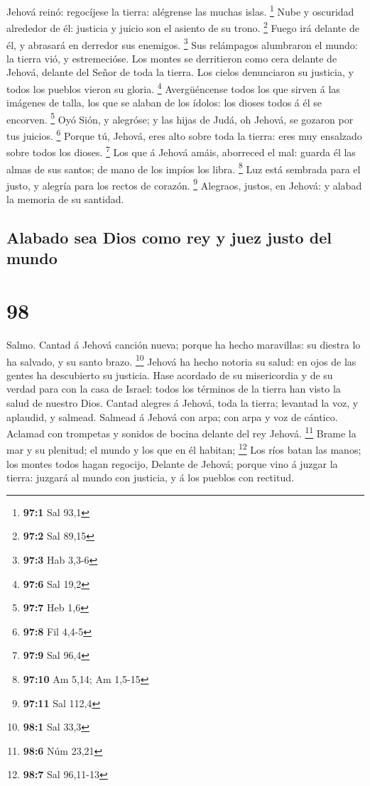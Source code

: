  Jehová reinó: regocíjese la tierra: alégrense las muchas
islas. \footnote{\textbf{97:1} Sal 93,1}  Nube y oscuridad
alrededor de él: justicia y juicio son el asiento de su trono.
\footnote{\textbf{97:2} Sal 89,15}  Fuego irá delante de él,
y abrasará en derredor sus enemigos. \footnote{\textbf{97:3} Hab 3,3-6}
 Sus relámpagos alumbraron el mundo: la tierra vió, y
estremecióse.  Los montes se derritieron como cera delante
de Jehová, delante del Señor de toda la tierra.  Los cielos
denunciaron su justicia, y todos los pueblos vieron su gloria.
\footnote{\textbf{97:6} Sal 19,2}  Avergüéncense todos los
que sirven á las imágenes de talla, los que se alaban de los ídolos: los
dioses todos á él se encorven. \footnote{\textbf{97:7} Heb 1,6}
 Oyó Sión, y alegróse; y las hijas de Judá, oh Jehová, se
gozaron por tus juicios. \footnote{\textbf{97:8} Fil 4,4-5} 
Porque tú, Jehová, eres alto sobre toda la tierra: eres muy ensalzado
sobre todos los dioses. \footnote{\textbf{97:9} Sal 96,4} 
Los que á Jehová amáis, aborreced el mal: guarda él las almas de sus
santos; de mano de los impíos los libra. \footnote{\textbf{97:10} Am
  5,14; Am 1,5-15}  Luz está sembrada para el justo, y
alegría para los rectos de corazón. \footnote{\textbf{97:11} Sal 112,4}
 Alegraos, justos, en Jehová: y alabad la memoria de su
santidad.

\hypertarget{alabado-sea-dios-como-rey-y-juez-justo-del-mundo}{%
\subsection{Alabado sea Dios como rey y juez justo del
mundo}\label{alabado-sea-dios-como-rey-y-juez-justo-del-mundo}}

\hypertarget{section-97}{%
\section{98}\label{section-97}}

 Salmo. Cantad á Jehová canción nueva; porque ha hecho
maravillas: su diestra lo ha salvado, y su santo brazo. \footnote{\textbf{98:1}
  Sal 33,3}  Jehová ha hecho notoria su salud: en ojos de
las gentes ha descubierto su justicia.  Hase acordado de su
misericordia y de su verdad para con la casa de Israel: todos los
términos de la tierra han visto la salud de nuestro Dios. 
Cantad alegres á Jehová, toda la tierra; levantad la voz, y aplaudid, y
salmead.  Salmead á Jehová con arpa; con arpa y voz de
cántico.  Aclamad con trompetas y sonidos de bocina delante
del rey Jehová. \footnote{\textbf{98:6} Núm 23,21}  Brame la
mar y su plenitud; el mundo y los que en él habitan; \footnote{\textbf{98:7}
  Sal 96,11-13}  Los ríos batan las manos; los montes todos
hagan regocijo,  Delante de Jehová; porque vino á juzgar la
tierra: juzgará al mundo con justicia, y á los pueblos con rectitud.

